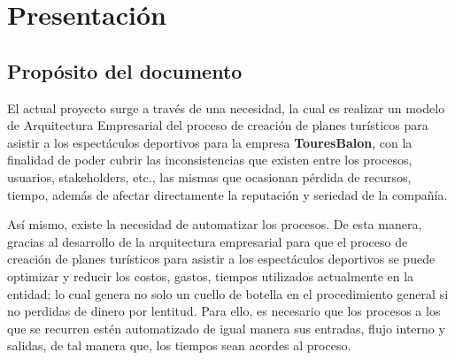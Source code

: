\documentclass[12pt]{article}
\begin{document}
\newpage




\newpage


\section{Presentación}










\subsection{Propósito del documento}

El actual proyecto surge a través de una necesidad, la cual es realizar un modelo de Arquitectura Empresarial del proceso de creación de planes turísticos para asistir a los espectáculos deportivos para la empresa \textbf{TouresBalon}, con la finalidad de poder cubrir las inconsistencias que existen entre los procesos, usuarios, stakeholders, etc., las mismas que ocasionan pérdida de recursos, tiempo, además de afectar directamente la reputación y seriedad de la compañía.

Así mismo, existe la necesidad de automatizar los procesos. De esta manera, gracias al desarrollo de la arquitectura empresarial para que el proceso de creación de planes turísticos para asistir a los espectáculos deportivos se puede optimizar y reducir los costos, gastos, tiempos utilizados actualmente en la entidad; lo cual genera no solo un cuello de botella en el procedimiento general si no perdidas de dinero por lentitud. Para ello, es necesario que los procesos a los que se recurren estén automatizado de igual manera sus entradas, flujo interno y salidas, de tal manera que, los tiempos sean acordes al proceso.  
\end{document}
